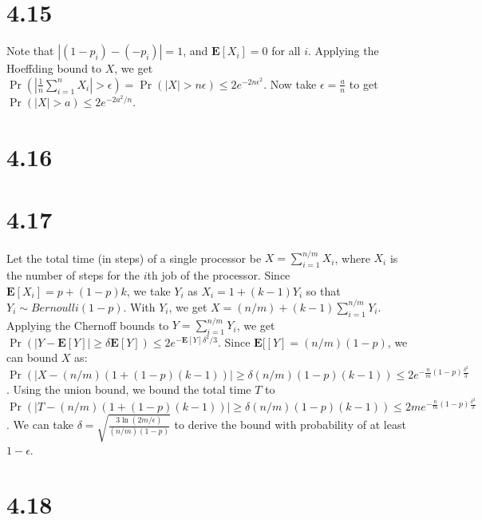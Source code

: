 \documentclass{article}
\begin{document}
\section*{4.15}
Note that $|(1-p_i)-(-p_i)|=1$, and $\textbf{E}[X_i]=0$ for all $i$.
Applying the Hoeffding bound to $X$, we get $\Pr(|\frac{1}{n}\sum\limits_{i=1}^nX_i | > \epsilon)=\Pr(|X|>n\epsilon)\leq2e^{-2n\epsilon^2}$.
Now take $\epsilon=\frac{a}{n}$ to get $\Pr(|X|>a)\leq 2e^{-2a^2/n}$.
\section*{4.16}
\section*{4.17}
Let the total time (in steps) of a single processor be $X=\sum\limits_{i=1}^{n/m}X_i$, where $X_i$ is the number of steps for the $i$th job of the processor.
Since $\textbf{E}[X_i]=p+(1-p)k$, we take $Y_i$ as $X_i=1+(k-1)Y_i$ so that $Y_i\sim Bernoulli(1-p)$. With $Y_i$, we get $X=(n/m)+(k-1)\sum\limits_{i=1}^{n/m}Y_i$.\\
Applying the Chernoff bounds to $Y=\sum\limits_{i=1}^{n/m}Y_i$, we get $\Pr(|Y-\textbf{E}[Y]|\geq \delta\textbf{E}[Y])\leq 2e^{-\textbf{E}[Y]\delta^2/3}$.
Since $\textbf{E}[[Y]=(n/m)(1-p)$, we can bound $X$ as:\\
$\Pr(|X-(n/m)(1+(1-p)(k-1))|\geq\delta (n/m)(1-p)(k-1))\leq2e^{-\frac{n}{m}(1-p)\frac{\delta^2}{3}}$.
Using the union bound, we bound the total time $T$ to $\Pr(|T-(n/m)(1+(1-p)(k-1))|\geq\delta (n/m)(1-p)(k-1))\leq2me^{-\frac{n}{m}(1-p)\frac{\delta^2}{3}}$.
We can take $\delta=\sqrt{\frac{3\ln(2m/\epsilon)}{(n/m)(1-p)}}$ to derive the bound with probability of at least $1-\epsilon$.
\section*{4.18}
\end{document}
